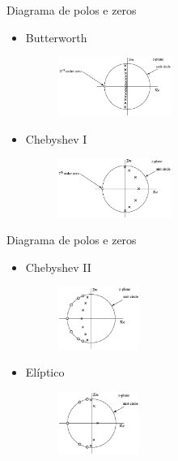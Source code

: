 \begin{slide}{Diagrama de polos e zeros}
	\begin{itemize}
		\item Butterworth
			\begin{figure}
				\centering 
				\includegraphics[width = 0.35\textwidth]{figs/bpz.eps}
			\end{figure}
		\item Chebyshev I
			\begin{figure}
				\centering 
				\includegraphics[width = 0.35\textwidth]{figs/cpz.eps}
			\end{figure}
	\end{itemize}
\end{slide}
\begin{slide}{Diagrama de polos e zeros}
	\begin{itemize}
		\item Chebyshev II
			\begin{figure}
				\centering 
				\includegraphics[width = 0.25\textwidth]{figs/c2pz.eps}
			\end{figure}
		\item Elíptico
			\begin{figure}
				\centering 
				\includegraphics[width = 0.25\textwidth]{figs/epz.eps}
			\end{figure}
	\end{itemize}
\end{slide}



